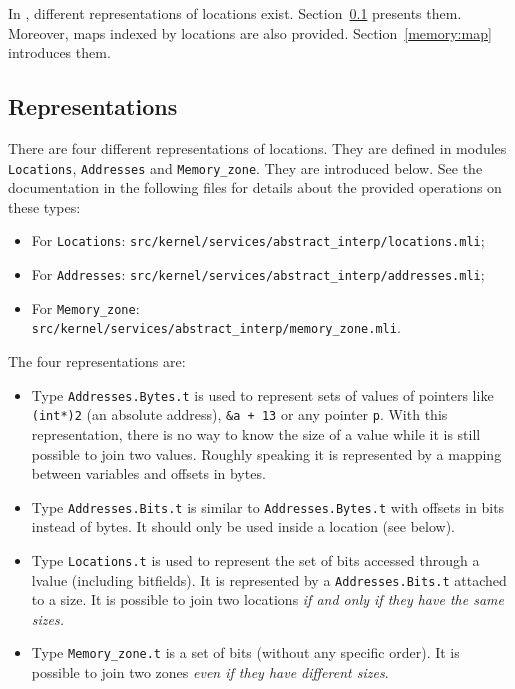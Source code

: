 In \framac, different representations of \C locations
exist. Section~\ref{memory:repr} presents them. Moreover, maps indexed by
locations are also provided. Section~\ref{memory:map} introduces them.

\subsection{Representations}\label{memory:repr}

There are four different representations of \C locations.
They are defined in modules
\texttt{Locations},
\texttt{Addresses} and
\texttt{Memory\_zone}. They are introduced below.
See the documentation in the following files for details about the
provided operations on these types:
\begin{itemize}
  \item For \texttt{Locations}:
    \texttt{src/kernel/services/abstract\_interp/locations.mli};
  \item For \texttt{Addresses}:
    \texttt{src/kernel/services/abstract\_interp/addresses.mli};
  \item For \texttt{Memory\_zone}:
    \texttt{src/kernel/services/abstract\_interp/memory\_zone.mli}.
\end{itemize}

The four representations are:
\begin{itemize}
\item Type \texttt{Addresses.Bytes.t}
  is used to represent sets of values of \C pointers like \texttt{(int*)2}
  (an absolute address), \texttt{\&a + 13} or any pointer \texttt{p}. With
  this representation, there is no way to know the size of a value while it
  is still possible to join two values. Roughly speaking it is
  represented by a mapping between \C variables and offsets in bytes.
\item Type \texttt{Addresses.Bits.t} is
  similar to \texttt{Addresses.Bytes.t} with offsets in bits instead of
  bytes. It should only be used inside a location (see below).
\item Type \texttt{Locations.t} is used to represent
  the set of bits accessed through a \C lvalue (including bitfields). It is
  represented by a \texttt{Addresses.Bits.t} attached to a size. It is possible
  to join two locations \emph{if and only if they have the same sizes.}
\item Type \texttt{Memory\_zone.t} is a set of bits (without
  any specific order). It is possible to join two zones \emph{even if they have
    different sizes}.
\end{itemize}

